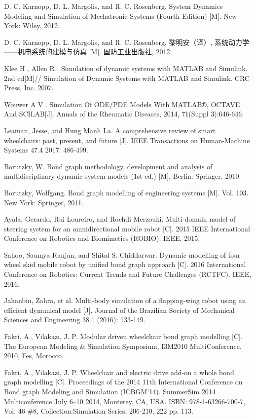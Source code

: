 \newpage
{}
\begin{thebibliography}{0}
	
	D. C. Karnopp, D. L. Margolis, and R. C. Rosenberg, System Dynamics Modeling and Simulation of Mechatronic Systems (Fourth Edition) [M]. New York: Wiley, 2012.
		
	D. C. Karnopp, D. L. Margolis, and R. C. Rosenberg, 黎明安（译）, 系统动力学——机电系统的建模与仿真 [M]. 国防工业出版社, 2012.
	
	Klee H , Allen R . Simulation of dynamic systems with MATLAB and Simulink. 2nd ed[M]// Simulation of Dynamic Systems with MATLAB and Simulink. CRC Press, Inc. 2007.
	
	Wouwer A V . Simulation Of ODE/PDE Models With MATLAB®, OCTAVE And SCILAB[J]. Annals of the Rheumatic Diseases, 2014, 71(Suppl 3):646-646.
	
	Leaman, Jesse, and Hung Manh La. A comprehensive review of smart wheelchairs: past, present, and future [J]. IEEE Transactions on Human-Machine Systems 47.4 2017: 486-499.
	
	Borutzky, W. Bond graph methodology, development and analysis of multidisciplinary dynamic system models (1st ed.) [M]. Berlin: Springer. 2010
	
	Borutzky, Wolfgang. Bond graph modelling of engineering systems  [M]. Vol. 103. New York: Springer, 2011.
	
	Ayala, Gerardo, Rui Loureiro, and Rochdi Merzouki. Multi-domain model of steering system for an omnidirectional mobile robot  [C]. 2015 IEEE International Conference on Robotics and Biomimetics (ROBIO). IEEE, 2015.
	
	Sahoo, Saumya Ranjan, and Shital S. Chiddarwar. Dynamic modelling of four wheel skid mobile robot by unified bond graph approach [C]. 2016 International Conference on Robotics: Current Trends and Future Challenges (RCTFC). IEEE, 2016.
	
	Jahanbin, Zahra, et al. Multi-body simulation of a flapping-wing robot using an efficient dynamical model [J]. Journal of the Brazilian Society of Mechanical Sciences and Engineering 38.1 (2016): 133-149.
	
	Fakri, A., Vilakazi, J. P. Modular driven wheelchair bond graph modelling [C]. The European Modeling \& Simulation Symposium, I3M2010 MultiConference, 2010, Fes, Morocco.
	
	Fakri, A., Vilakazi, J. P. Wheelchair and electric drive add-on a whole bond graph modelling [C]. Proceedings of the 2014 11th International Conference on Bond graph Modeling and Simulation (ICBGM’14). SummerSim 2014 Multiconference July 6–10 2014, Monterey, CA, USA. ISBN: 978-1-63266-700-7, Vol. 46 \#8, Collection:Simulation Series, 206-210, 222 pp. 113.
	
\end{thebibliography}